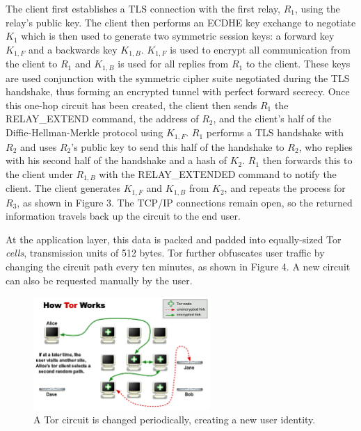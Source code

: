 The client first establishes a TLS connection with the first relay, $R_{1}$, using the relay's public key. The client then performs an ECDHE key exchange to negotiate $K_{1}$ which is then used to generate two symmetric session keys: a forward key $K_{1,F}$ and a backwards key $K_{1,B}$. $K_{1,F}$ is used to encrypt all communication from the client to $R_{1}$ and $K_{1,B}$ is used for all replies from $R_{1}$ to the client. These keys are used conjunction with the symmetric cipher suite negotiated during the TLS handshake, thus forming an encrypted tunnel with perfect forward secrecy. Once this one-hop circuit has been created, the client then sends $R_{1}$ the RELAY\_EXTEND command, the address of $R_{2}$, and the client's half of the Diffie-Hellman-Merkle protocol using $K_{1,F}$. $R_{1}$ performs a TLS handshake with $R_{2}$ and uses $R_{2}$'s public key to send this half of the handshake to $R_{2}$, who replies with his second half of the handshake and a hash of $K_{2}$. $R_{1}$ then forwards this to the client under $R_{1,B}$ with the RELAY\_EXTENDED command to notify the client. The client generates $K_{1,F}$ and $K_{1,B}$ from $K_{2}$, and repeats the process for $R_{3}$,\cite{ling2013protocol} as shown in Figure 3. The TCP/IP connections remain open, so the returned information travels back up the circuit to the end user.

At the application layer, this data is packed and padded into equally-sized Tor \textit{cells}, transmission units of 512 bytes. Tor further obfuscates user traffic by changing the circuit path every ten minutes,\cite{mccoy2008shining} as shown in Figure 4. A new circuit can also be requested manually by the user.

\begin{figure}[htbp]
	\centering
	\includegraphics[width=0.6\textwidth]{images/Tor/circuit-change-1-4.png}
	\caption{A Tor circuit is changed periodically, creating a new user identity.}
\end{figure}


